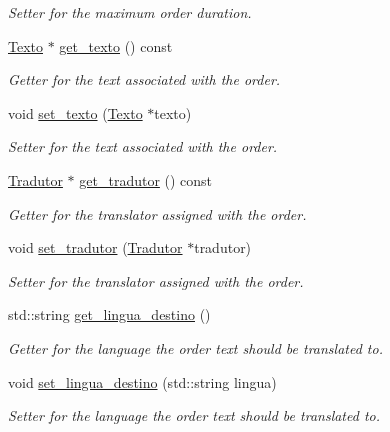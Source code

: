 \begin{DoxyCompactItemize}
\begin{DoxyCompactList}\small\item\em Setter for the maximum order duration. \end{DoxyCompactList}\item 
\hyperlink{class_texto}{Texto} $\ast$ \hyperlink{class_encomenda_a0a31fd2124968159893d3257b9cadd15}{get\-\_\-texto} () const 
\begin{DoxyCompactList}\small\item\em Getter for the text associated with the order. \end{DoxyCompactList}\item 
void \hyperlink{class_encomenda_ab814e5f0fbbb1950393a376eb65f7c63}{set\-\_\-texto} (\hyperlink{class_texto}{Texto} $\ast$texto)
\begin{DoxyCompactList}\small\item\em Setter for the text associated with the order. \end{DoxyCompactList}\item 
\hyperlink{class_tradutor}{Tradutor} $\ast$ \hyperlink{class_encomenda_a50c1aefd950ca5852e93beec8882db70}{get\-\_\-tradutor} () const 
\begin{DoxyCompactList}\small\item\em Getter for the translator assigned with the order. \end{DoxyCompactList}\item 
void \hyperlink{class_encomenda_a05d46d1c4f6e83df419b2feb7cb9a082}{set\-\_\-tradutor} (\hyperlink{class_tradutor}{Tradutor} $\ast$tradutor)
\begin{DoxyCompactList}\small\item\em Setter for the translator assigned with the order. \end{DoxyCompactList}\item 
std\-::string \hyperlink{class_encomenda_a3b9689429c6ae78580421a96742f9687}{get\-\_\-lingua\-\_\-destino} ()
\begin{DoxyCompactList}\small\item\em Getter for the language the order text should be translated to. \end{DoxyCompactList}\item 
void \hyperlink{class_encomenda_af8b12f8fba9c65a937f60ed81f9e0770}{set\-\_\-lingua\-\_\-destino} (std\-::string lingua)
\begin{DoxyCompactList}\small\item\em Setter for the language the order text should be translated to. \end{DoxyCompactList}\item 

\end{DoxyCompactItemize}
